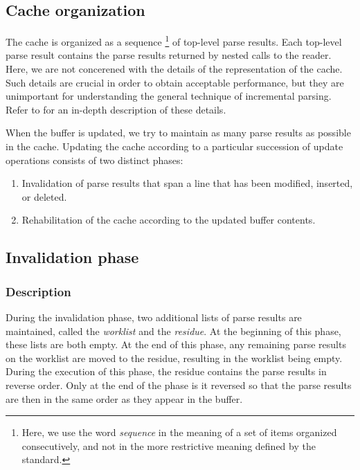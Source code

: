 \subsection{Cache organization}

The cache is organized as a sequence%
\footnote{Here, we use the word \emph{sequence} in the meaning of a
  set of items organized consecutively, and not in the more
  restrictive meaning defined by the \commonlisp{} standard.}  of
top-level parse results.  Each top-level parse result contains the
parse results returned by nested calls to the reader.  Here, we are
not concerened with the details of the representation of the cache.
Such details are crucial in order to obtain acceptable performance,
but they are unimportant for understanding the general technique of
incremental parsing.  Refer to  for an
in-depth description of these details.

When the buffer is updated, we try to maintain as many parse results
as possible in the cache.  Updating the cache according to a
particular succession of update operations consists of two distinct
phases:

\begin{enumerate}
\item Invalidation of parse results that span a line that has been
  modified, inserted, or deleted.
\item Rehabilitation of the cache according to the updated buffer
  contents.
\end{enumerate}

\subsection{Invalidation phase}

\subsubsection{Description}

During the invalidation phase, two additional lists of parse results
are maintained, called the \emph{worklist} and the \emph{residue}.  At
the beginning of this phase, these lists are both empty.  At the end
of this phase, any remaining parse results on the worklist are moved
to the residue, resulting in the worklist being empty.  During the
execution of this phase, the residue contains the parse results in
reverse order.  Only at the end of the phase is it reversed so that
the parse results are then in the same order as they appear in the
buffer.

